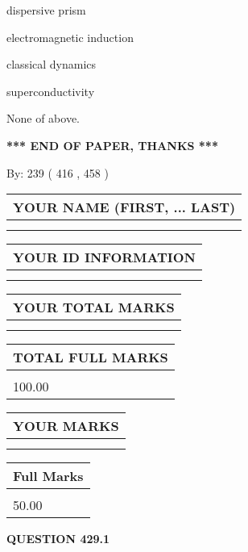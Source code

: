 \documentclass[12pt]{article}
\begin{document}
 
dispersive prism
 
 
electromagnetic induction
 
 
classical dynamics
 
 
superconductivity
 
 
 None of above.
 
 
   
   
\vspace{1.0in} 
{\textbf{\large{ *** END OF PAPER, THANKS *** }}} 
   
   
\hspace{1.0in} By: 
 239 ( 416 ,  458 )
   
   
   
   
\newpage 
\setcounter{page}{ 
   429001 } 
   
   
   
   
\noindent\begin{tabular}{|l|}
\hline
YOUR NAME (FIRST, ... LAST)  \\
\hline
 \\ 
 \\ 
\hline
\end{tabular}
\hspace{0.05in} \begin{tabular}{|l|}
\hline
 YOUR   ID   INFORMATION  \\
\hline
 \\ 
 \\ 
\hline
\end{tabular}
   
   
\vspace{0.2in}\noindent\begin{tabular}{|l|}
\hline
YOUR TOTAL MARKS  \\
\hline
 \\ 
 \\ 
\hline
\end{tabular}
\hspace{0.05in} \begin{tabular}{|l|}
\hline
TOTAL FULL MARKS  \\
\hline
 \\ 
100.00 \\
\hline
\end{tabular}
  
\vspace{0.2in}
  
\noindent\begin{tabular}{|l|}
\hline
 YOUR MARKS  \\
\hline
 \\ 
 \\ 
\hline
\end{tabular}
\hspace{0.05in} \begin{tabular}{|l|}
\hline
 Full Marks  \\
\hline
 \\ 
50.00 \\
\hline
\end{tabular}
{\textbf{\Large{QUESTION
429.1 
}}}
  
\end{document}
